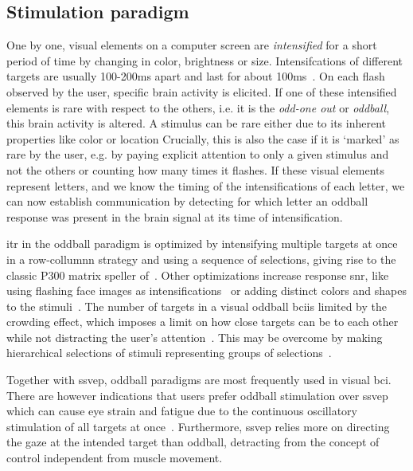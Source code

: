 \subsection{Stimulation paradigm}
One by one, visual elements on a computer screen are \emph{intensified} for a
short period of time by changing in color, brightness or size.
Intensifcations of different targets are usually 100-200ms apart and last for about
100ms~\cite{Sellers2006a}.
On each flash observed by the user, specific brain activity is elicited.
If one of these intensified elements is rare with respect to the others, i.e. it is the
\emph{odd-one out} or \emph{oddball}, this brain activity is altered.
A stimulus can be rare either due to its inherent properties like color or
location
Crucially, this is also the case if it is `marked' as rare by the user, e.g.
by paying explicit attention to only a given stimulus and not the others or
counting how many times it flashes.
If these visual elements represent letters, and we know the timing of the
intensifications of each letter, we can now establish communication by detecting
for which letter an oddball response was present in the brain signal at its
time of intensification.

\Ac{itr} in the oddball paradigm is optimized by intensifying
multiple targets at once in a row-collumnn strategy and using a sequence of
selections, giving rise to the classic
P300 matrix speller of~\cite{Farwell1988}.
Other optimizations increase response \ac{snr}, like using flashing face
images as intensifications~\cite{Jin2012} or adding distinct colors and shapes to the
stimuli~\cite{Treder2011}.
The number of targets in a visual oddball \ac{bci}is limited by the crowding
effect, which imposes a limit on how close targets can be to each other while
not distracting the user's attention~\cite{Sellers2006a,Li2010}.
This may be overcome by making hierarchical selections of stimuli representing
groups of selections~\cite{Treder2010}.

Together with \ac{ssvep}, oddball paradigms are most frequently used in visual
\ac{bci}.
There are however indications that users prefer oddball stimulation over
\ac{ssvep} which can cause eye strain and fatigue due to the continuous
oscillatory stimulation of all targets at once~\cite{Xu2021}.
Furthermore, \ac{ssvep} relies more on directing the gaze at the intended
target than oddball, detracting from the concept of control independent from
muscle movement.


